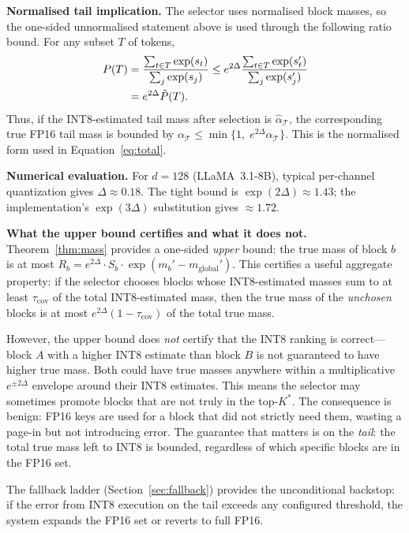 \documentclass[10pt,twocolumn,a4paper]{article}
\theoremstyle{definition}
\theoremstyle{remark}
\begin{document}
\textbf{Normalised tail implication.}  The selector uses normalised block masses, so the one-sided unnormalised statement above is used through the following ratio bound.  For any subset $T$ of tokens,
\begin{align}
  P(T) &= \frac{\sum_{t\in T}\exp(s_t)}{\sum_j \exp(s_j)}
  \leq e^{2\Delta}
  \frac{\sum_{t\in T}\exp(s'_t)}{\sum_j \exp(s'_j)} \notag \\
  &= e^{2\Delta}\hat{P}(T).
\end{align}
Thus, if the INT8-estimated tail mass after selection is $\hat{\alpha}_{\mathcal{T}}$, the corresponding true FP16 tail mass is bounded by $\alpha_{\mathcal{T}} \leq \min\{1,\; e^{2\Delta}\hat{\alpha}_{\mathcal{T}}\}$.  This is the normalised form used in Equation~\eqref{eq:total}.

\textbf{Numerical evaluation.}  For $d = 128$ (LLaMA~3.1-8B), typical per-channel quantization gives $\Delta \approx 0.18$.  The tight bound is $\exp(2\Delta) \approx 1.43$; the implementation's $\exp(3\Delta)$ substitution gives $\approx 1.72$.

\textbf{What the upper bound certifies and what it does not.}  Theorem~\ref{thm:mass} provides a one-sided \emph{upper} bound: the true mass of block $b$ is at most $R_b = e^{2\Delta} \cdot S_b \cdot \exp(m_b' - m_{\mathrm{global}}')$.  This certifies a useful aggregate property: if the selector chooses blocks whose INT8-estimated masses sum to at least $\tau_{\mathrm{cov}}$ of the total INT8-estimated mass, then the true mass of the \emph{unchosen} blocks is at most $e^{2\Delta} (1 - \tau_{\mathrm{cov}})$ of the total true mass.

However, the upper bound does \emph{not} certify that the INT8 ranking is correct---block $A$ with a higher INT8 estimate than block $B$ is not guaranteed to have higher true mass.  Both could have true masses anywhere within a multiplicative $e^{\pm 2\Delta}$ envelope around their INT8 estimates.  This means the selector may sometimes promote blocks that are not truly in the top-$K^*$.  The consequence is benign: FP16 keys are used for a block that did not strictly need them, wasting a page-in but not introducing error.  The guarantee that matters is on the \emph{tail}: the total true mass left to INT8 is bounded, regardless of which specific blocks are in the FP16 set.

The fallback ladder (Section~\ref{sec:fallback}) provides the unconditional backstop: if the error from INT8 execution on the tail exceeds any configured threshold, the system expands the FP16 set or reverts to full FP16.
\end{document}
